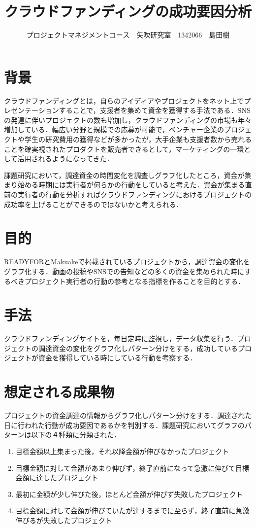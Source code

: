 \documentclass[uplatex,twocolumn,dvipdfmx]{jsarticle}
\title{\vspace{-5mm}\fontsize{14pt}{0pt}\selectfont クラウドファンディングの成功要因分析}
\author{\normalsize プロジェクトマネジメントコース　矢吹研究室　1342066　島田樹}
\date{}
\begin{document}
\fontsize{10.5pt}{\baselineskip}\selectfont
\maketitle





\section{背景}
クラウドファンディング\cite{wiki}とは，自らのアイディアやプロジェクトをネット上でプレゼンテーションすることで，支援者を集めて資金を獲得する手法である．SNSの発達に伴いプロジェクトの数も増加し，クラウドファンディングの市場も年々増加している\cite{visualizing}．幅広い分野と規模での応募が可能で，ベンチャー企業のプロジェクトや学生の研究費用の獲得などが多かったが，大手企業も支援者数から売れることを確実視されたプロダクトを販売者できるとして，マーケティングの一環として活用されるようになってきた．

課題研究において，調達資金の時間変化を調査しグラフ化したところ，資金が集まり始める時期には実行者が何らかの行動をしていると考えた．資金が集まる直前の実行者の行動を分析すればクラウドファンディングにおけるプロジェクトの成功率を上げることができるのではないかと考えられる．


\section{目的}
READYFORとMakuakeで掲載されているプロジェクトから，調達資金の変化をグラフ化する．動画の投稿やSNSでの告知などの多くの資金を集められた時にするべきプロジェクト実行者の行動の参考となる指標を作ることを目的とする．


\section{手法}
クラウドファンディングサイトを，毎日定時に監視し，データ収集を行う．プロジェクトの調達資金の変化をグラフ化しパターン分けをする，成功しているプロジェクトが資金を獲得している時にしている行動を考察する．


\section{想定される成果物}
プロジェクトの資金調達の情報からグラフ化しパターン分けをする．調達された日に行われた行動が成功要因であるかを判別する．課題研究においてグラフのパターンは以下の４種類に分類された．
\begin{enumerate}
 \item 目標金額以上集まった後，それ以降金額が伸びなかったプロジェクト
 \item 目標金額に対して金額があまり伸びず，終了直前になって急激に伸びて目標金額に達したプロジェクト　
 \item 最初に金額が少し伸びた後，ほとんど金額が伸びず失敗したプロジェクト
 \item 目標金額に対して金額が伸びていたが達するまでに至らず，終了直前に急激伸びるが失敗したプロジェクト
\end{enumerate}
\end{document}

